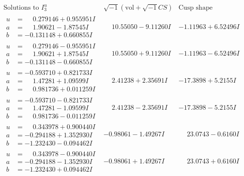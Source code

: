 \documentclass[1p]{elsarticle_modified}
\theoremstyle{definition}
\newcommand{\I}{\sqrt{-1}}
\begin{document}
$$\begin{array}{c|c|c}  
\text{Solutions to }I^u_{3}& \I (\text{vol} + \sqrt{-1}CS) & \text{Cusp shape}\\
 \hline 
\begin{aligned}
u &= \phantom{-}0.279146 + 0.955951 I \\
a &= \phantom{-}1.90621 - 1.87545 I \\
b &= -0.131148 + 0.660855 I\end{aligned}
 & \phantom{-}10.55050 - 9.11260 I & -1.11963 + 6.52496 I \\ \hline\begin{aligned}
u &= \phantom{-}0.279146 - 0.955951 I \\
a &= \phantom{-}1.90621 + 1.87545 I \\
b &= -0.131148 - 0.660855 I\end{aligned}
 & \phantom{-}10.55050 + 9.11260 I & -1.11963 - 6.52496 I \\ \hline\begin{aligned}
u &= -0.593710 + 0.821733 I \\
a &= \phantom{-}1.47281 + 1.09599 I \\
b &= \phantom{-}0.981736 + 0.011259 I\end{aligned}
 & \phantom{-}2.41238 + 2.35691 I & -17.3898 + 5.2155 I \\ \hline\begin{aligned}
u &= -0.593710 - 0.821733 I \\
a &= \phantom{-}1.47281 - 1.09599 I \\
b &= \phantom{-}0.981736 - 0.011259 I\end{aligned}
 & \phantom{-}2.41238 - 2.35691 I & -17.3898 - 5.2155 I \\ \hline\begin{aligned}
u &= \phantom{-}0.343978 + 0.900440 I \\
a &= -0.294188 + 1.352930 I \\
b &= -1.232430 - 0.094462 I\end{aligned}
 & -0.98061 - 1.49267 I & \phantom{-}23.0743 - 0.6160 I \\ \hline\begin{aligned}
u &= \phantom{-}0.343978 - 0.900440 I \\
a &= -0.294188 - 1.352930 I \\
b &= -1.232430 + 0.094462 I\end{aligned}
 & -0.98061 + 1.49267 I & \phantom{-}23.0743 + 0.6160 I \\ \hline\begin{aligned}

\end{aligned}
\end{array}$$
\end{document}
